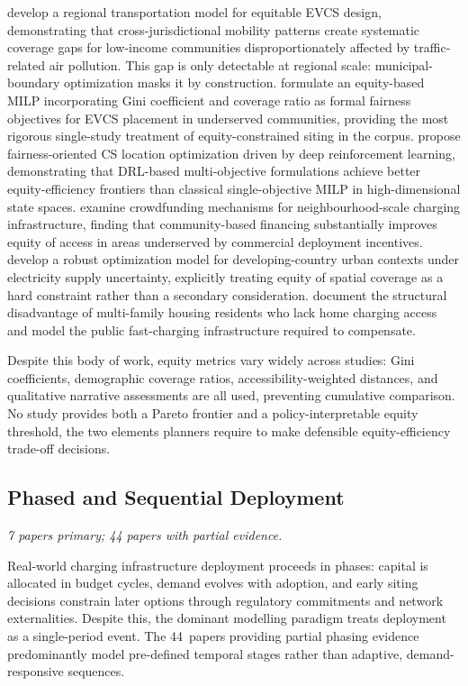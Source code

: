 \documentclass[12pt,letterpaper]{article}
\begin{document}
\citet{babur2026} develop a regional transportation model for equitable
EVCS design, demonstrating that cross-jurisdictional mobility patterns
create systematic coverage gaps for low-income communities
disproportionately affected by traffic-related air pollution.  This gap
is only detectable at regional scale: municipal-boundary optimization
masks it by construction.  \citet{jha2025} formulate an equity-based
MILP incorporating Gini coefficient and coverage ratio as formal fairness
objectives for EVCS placement in underserved communities, providing the
most rigorous single-study treatment of equity-constrained siting in the
corpus.  \citet{yuan2025_fairness} propose fairness-oriented CS location
optimization driven by deep reinforcement learning, demonstrating that
DRL-based multi-objective formulations achieve better equity-efficiency
frontiers than classical single-objective MILP in high-dimensional state
spaces.  \citet{erfani2024} examine crowdfunding mechanisms for
neighbourhood-scale charging infrastructure, finding that community-based
financing substantially improves equity of access in areas underserved
by commercial deployment incentives.  \citet{arief2023} develop a robust
optimization model for developing-country urban contexts under electricity
supply uncertainty, explicitly treating equity of spatial coverage as a
hard constraint rather than a secondary consideration.  \citet{khan2021}
document the structural disadvantage of multi-family housing residents
who lack home charging access and model the public fast-charging
infrastructure required to compensate.

Despite this body of work, equity metrics vary widely across studies:
Gini coefficients, demographic coverage ratios, accessibility-weighted
distances, and qualitative narrative assessments are all used, preventing
cumulative comparison.  No study provides both a Pareto frontier and a
policy-interpretable equity threshold, the two elements planners require
to make defensible equity-efficiency trade-off decisions.

\subsection{Phased and Sequential Deployment}

\textit{7 papers primary; 44 papers with partial evidence.}

Real-world charging infrastructure deployment proceeds in phases:
capital is allocated in budget cycles, demand evolves with adoption, and
early siting decisions constrain later options through regulatory
commitments and network externalities.  Despite this, the dominant
modelling paradigm treats deployment as a single-period event.  The
44~papers providing partial phasing evidence predominantly model
pre-defined temporal stages rather than adaptive, demand-responsive
sequences.
\end{document}
